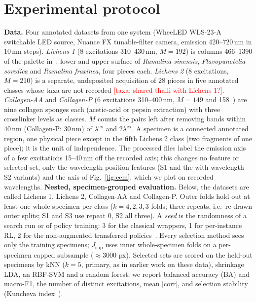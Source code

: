 \documentclass[conference]{IEEEtran}
\newcommand{\OPEN}[1]{\textcolor{red}{[#1]}}
\newcommand{\JS}{J_{\mathrm{sup}}}
\begin{document}
\section{Experimental protocol}
\textbf{Data.} Four annotated datasets from one system (WheeLED WLS-23-A switchable LED source, Nuance FX tunable-filter camera, emission 420--720\,nm in 10\,nm steps). \emph{Lichens 1} (8 excitations 310--430\,nm, $M=192$) is columns 466--1390 of the palette in~\cite{lichens_zenodo}: lower and upper surface of \emph{Ramalina sinensis}, \emph{Flavopunctelia soredica} and \emph{Ramalina fraxinea}, four pieces each. \emph{Lichens 2} (8 excitations, $M=210$) is a separate, undeposited acquisition of 28 pieces in five annotated classes whose taxa are not recorded \OPEN{taxa; shared thalli with Lichens 1?}. \emph{Collagen-AA} and \emph{Collagen-P} (6 excitations 310--400\,nm, $M=149$ and 158~\cite{collagen_zenodo}) are nine collagen sponges each (acetic-acid or pepsin extraction) with three crosslinker levels as classes. $M$ counts the pairs left after removing bands within 40\,nm (Collagen-P: 30\,nm) of $\lambda^{\mathrm{ex}}$ and $2\lambda^{\mathrm{ex}}$. A specimen is a connected annotated region, one physical piece except in the fifth Lichens 2 class (two fragments of one piece); it is the unit of independence. The processed files label the emission axis of a few excitations 15--40\,nm off the recorded axis; this changes no feature or selected set, only the wavelength-position features (S1 and the with-wavelength S2 variants) and the axis of Fig.~\ref{fig:eem}, which we plot on recorded wavelengths.
\textbf{Nested, specimen-grouped evaluation.} Below, the datasets are called Lichens 1, Lichens 2, Collagen-AA and Collagen-P. Outer folds hold out at least one whole specimen per class ($k=4,2,3,3$ folds; three repeats, i.e.\ re-drawn outer splits; S1 and S3 use repeat 0, S2 all three). A \emph{seed} is the randomness of a search run or of policy training: 3 for the classical wrappers, 1 for per-instance RL, 2 for the non-augmented transferred policies~\cite{roberts2017cv,varma2006bias}. Every selection method sees only the training specimens; $\JS$ uses inner whole-specimen folds on a per-specimen capped subsample ($\approx$3000 px). Selected sets are scored on the held-out specimens by kNN ($k=5$, primary, as in earlier work on these data), shrinkage LDA, an RBF-SVM and a random forest; we report balanced accuracy (BA) and macro-F1, the number of distinct excitations, mean $|\mathrm{corr}|$, and selection stability (Kuncheva index~\cite{kuncheva2007stability}).
\end{document}
